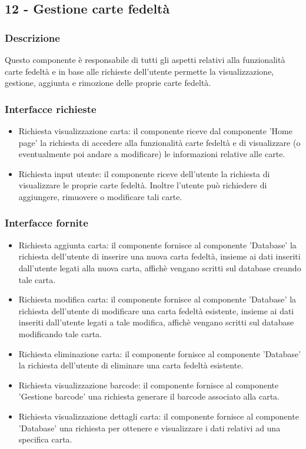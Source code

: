 \documentclass[a4paper,12pt]{article}
\begin{document}
\subsection*{12 -  Gestione carte fedeltà}
\subsubsection*{Descrizione}
Questo componente è responsabile di tutti gli aspetti relativi alla funzionalità carte fedeltà e in base alle richieste dell'utente permette la visualizzazione, gestione, aggiunta e rimozione delle proprie carte fedeltà.
\subsubsection*{Interfacce richieste}
\begin{itemize} \setlength\itemsep{0.01em}.
\item {\sffamily Richiesta visualizzazione carta}: il componente riceve dal componente 'Home page'  la richiesta di accedere alla funzionalità carte fedeltà e di visualizzare (o eventualmente poi andare a modificare) le informazioni relative alle carte.
\item {\sffamily Richiesta input utente}: il componente riceve dell'utente la richiesta di visualizzare le proprie carte fedeltà. Inoltre l'utente può richiedere di aggiungere, rimuovere o modificare tali carte.

\end{itemize}

\subsubsection*{Interfacce fornite}
\begin{itemize} \setlength\itemsep{0.01em}
\item {\sffamily Richiesta aggiunta carta}: il componente fornisce al componente 'Database' la richiesta dell'utente di inserire una nuova carta fedeltà, insieme ai dati inseriti dall'utente legati alla nuova carta, affichè vengano scritti sul database creando tale carta.
\item {\sffamily Richiesta modifica carta}: il componente fornisce al componente 'Database'  la richiesta dell'utente di modificare una carta fedeltà esistente, insieme ai dati inseriti dall'utente legati a tale modifica, affichè vengano scritti sul database modificando tale carta.
\item {\sffamily Richiesta eliminazione carta}: il componente fornisce al componente 'Database'  la richiesta dell'utente di eliminare una carta fedeltà esistente.
\item {\sffamily Richiesta visualizzazione barcode}: il componente fornisce al componente 'Gestione barcode' una richiesta generare il barcode associato alla carta.
\item {\sffamily Richiesta visualizzazione dettagli carta}: il componente fornisce al componente 'Database' una richiesta per ottenere e visualizzare i dati relativi ad una specifica carta.
\end{itemize}
\end{document}
